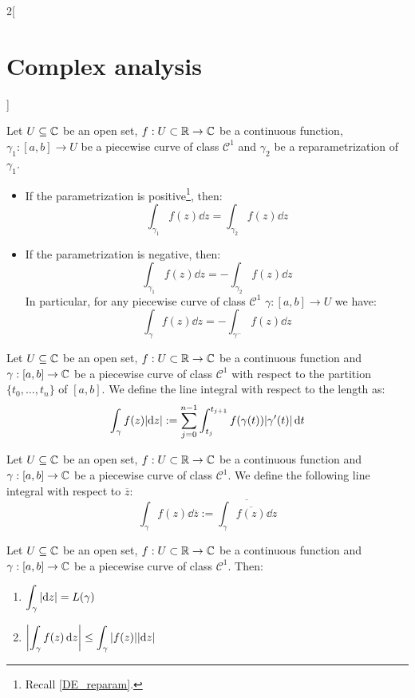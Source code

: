 \documentclass[../../../main.tex]{subfiles}
\begin{document}
\begin{multicols}{2}[\section{Complex analysis}]
\begin{proposition}
    Let $U\subseteq \mathbb{C}$ be an open set, $f:U\subset\mathbb{R}\rightarrow\mathbb{C}$ be a continuous function, $\gamma_1:[a,b]\rightarrow U$ be a piecewise curve of class $\mathcal{C}^1$ and $\gamma_2$ be a reparametrization of $\gamma_1$.
    \begin{itemize}
      \item If the parametrization is positive\footnote{Recall \cref{DE_reparam}.}, then: $$\int_{\gamma_1}f(z)\dd{z}=\int_{\gamma_2}f(z)\dd{z}$$
      \item If the parametrization is negative, then: $$\int_{\gamma_1}f(z)\dd{z}=-\int_{\gamma_2}f(z)\dd{z}$$
            In particular, for any piecewise curve of class $\mathcal{C}^1$ $\gamma:[a,b]\rightarrow U$ we have: $$\int_{\gamma}f(z)\dd{z}=-\int_{\gamma^-}f(z)\dd{z}$$
    \end{itemize}
  \end{proposition}
  \begin{definition}
    Let $U\subseteq \mathbb{C}$ be an open set, $f:U\subset\mathbb{R}\rightarrow\mathbb{C}$ be a continuous function and $\gamma:[a,b]\rightarrow\mathbb{C}$ be a piecewise curve of class $\mathcal{C}^1$ with respect to the partition $\{t_0,\ldots,t_n\}$ of $[a,b]$. We define the line integral with respect to the length as: $$\int_{\gamma}f(z)\abs{\dd{z}}:=\sum_{j=0}^{n-1}\int_{t_j}^{t_{j+1}}f(\gamma(t))|\gamma'(t)|\dd{t}$$
  \end{definition}
  \begin{definition}
    Let $U\subseteq \mathbb{C}$ be an open set, $f:U\subset\mathbb{R}\rightarrow\mathbb{C}$ be a continuous function and $\gamma:[a,b]\rightarrow\mathbb{C}$ be a piecewise curve of class $\mathcal{C}^1$. We define the following line integral with respect to $\overline{z}$: $$\int_{\gamma}f(z)\dd{\overline{z}}:=\overline{\int_{\gamma}\overline{f(z)}\dd{z}}$$
  \end{definition}
  \begin{proposition}
    Let $U\subseteq \mathbb{C}$ be an open set, $f:U\subset\mathbb{R}\rightarrow\mathbb{C}$ be a continuous function and $\gamma:[a,b]\rightarrow\mathbb{C}$ be a piecewise curve of class $\mathcal{C}^1$. Then:
    \begin{enumerate}
      \item $\displaystyle\int_{\gamma}\abs{\dd{z}}=L(\gamma)$
      \item $\displaystyle\left|\int_{\gamma}f(z)\dd{z}\right|\leq\int_{\gamma}|f(z)|\abs{\dd{z}}$
    \end{enumerate}
  \end{proposition}

\end{multicols}
\end{document}
